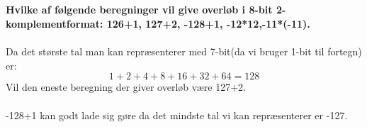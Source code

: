\documentclass[a4,11pt]{article}
\begin{document}
\subsection{}
\textbf{Hvilke af følgende beregninger vil give overløb i 8-bit 2-komplementformat: 126+1, 127+2, -128+1, -12*12,-11*(-11).}
\\\\
Da det største tal man kan repræsenterer med 7-bit(da vi bruger 1-bit til fortegn) er:
$$1+2+4+8+16+32+64=128$$
Vil den eneste beregning der giver overløb være 127+2.\\
\\
-128+1 kan godt lade sig gøre da det mindste tal vi kan repræsenterer er -127.
\end{document}
